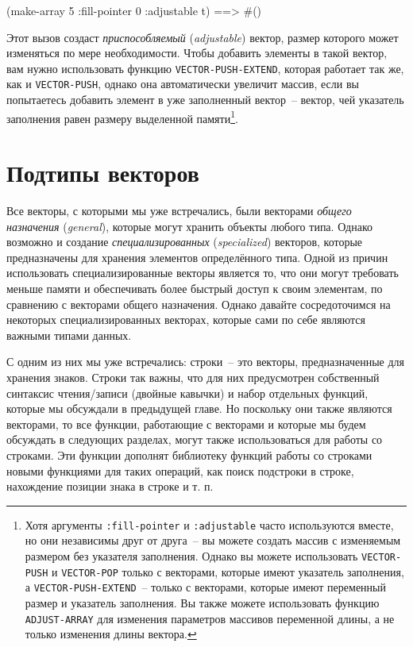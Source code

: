 \begin{myverb}
(make-array 5 :fill-pointer 0 :adjustable t) ==> #()
\end{myverb}

Этот вызов создаст \textit{приспособляемый} (\textit{adjustable}) вектор, размер которого
может изменяться по мере необходимости.  Чтобы
добавить элементы в такой вектор, вам нужно использовать функцию
\lstinline{VECTOR-PUSH-EXTEND}, которая работает так же, как и \lstinline{VECTOR-PUSH}, однако
она автоматически увеличит массив, если вы попытаетесь добавить элемент в
уже заполненный вектор~-- вектор, чей указатель заполнения равен размеру выделенной
памяти\footnote{Хотя аргументы \lstinline{:fill-pointer} и \lstinline{:adjustable} часто используются
  вместе, но они независимы друг от друга~-- вы можете создать
  массив с изменяемым размером без указателя заполнения.  Однако вы можете использовать
  \lstinline{VECTOR-PUSH} и \lstinline{VECTOR-POP} только с векторами, которые имеют указатель
  заполнения, а \lstinline{VECTOR-PUSH-EXTEND}~-- только с векторами, которые имеют переменный
  размер и указатель заполнения.  Вы также можете использовать функцию \lstinline{ADJUST-ARRAY}
  для изменения параметров массивов переменной длины, а не только изменения длины
  вектора.}\hspace{\footnotenegspace}.


\section{Подтипы векторов}

Все векторы, с которыми мы уже встречались, были векторами \textit{общего назначения}
(\textit{general}), которые могут хранить объекты любого типа.  Однако возможно и
создание \textit{специализированных} (\textit{specialized}) векторов,
которые предназначены для хранения элементов определённого типа.  Одной из
причин использовать специализированные векторы является то, что они могут требовать
меньше памяти и обеспечивать более быстрый доступ к своим элементам, по сравнению с
векторами общего назначения.  Однако давайте сосредоточимся на некоторых
специализированных векторах, которые сами по себе являются важными типами данных.

С одним из них мы уже встречались: строки~-- это векторы, предназначенные для хранения
знаков.  Строки так важны, что для них предусмотрен собственный синтаксис чтения/записи
(двойные кавычки) и набор отдельных функций, которые мы обсуждали в предыдущей главе.  Но
поскольку они также являются векторами, то все функции, работающие с векторами и которые мы
будем обсуждать в следующих разделах, могут также использоваться для работы со строками.
Эти функции дополнят библиотеку функций работы со строками новыми функциями для таких
операций, как поиск подстроки в строке, нахождение позиции знака в строке и т. п.

